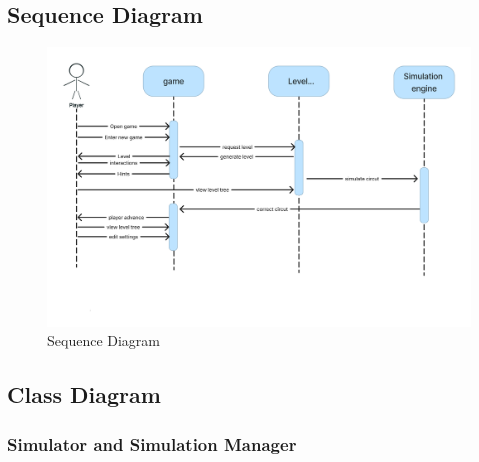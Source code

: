 \documentclass[../main.tex]{subfiles}
\begin{document}
\subsection{Sequence Diagram}
\begin{figure}[h!t]
\centering
\includegraphics[scale=0.11]{images/chapter3/sq.png}
\caption{Sequence Diagram}
\label{Sequence Diagram}
\end{figure}
\vfill
\newpage
\subsection{Class Diagram}

\subsubsection{Simulator and Simulation Manager}
\end{document}
